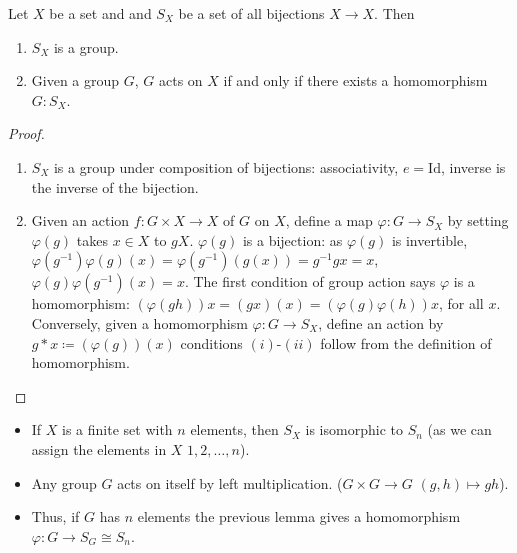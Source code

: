 \documentclass[10pt, a4paper]{article}
\begin{document}
\begin{lemma}
    Let $X$ be a set and and $S_X$ be a set of all bijections $X \to X$.
    Then
    \begin{enumerate}[label = (\alph*)]
        \item $S_X$ is a group.

        \item Given a group $G$,
        $G$ acts on $X$ if and only if there exists a homomorphism $G : S_X$.
    \end{enumerate}

    \begin{proof}
        \begin{enumerate}[label = (\alph*)]
            \item $S_{X}$ is a group under composition of bijections:
            associativity,
            $e = \mathrm{Id}$,
            inverse is the inverse of the bijection.

            \item Given an action $f : G \times X \to X$ of $G$ on $X$,
            define a map $\varphi : G \to S_X$ by setting $\varphi(g)$ takes $x \in X$ to $gX$.
            $\varphi(g)$ is a bijection:
            as $\varphi(g)$ is invertible,
            $\varphi(g ^ {-1})\varphi(g)(x) = \varphi(g ^ {-1})(g(x)) = g ^ {-1}gx = x$,
            $\varphi(g)\varphi(g ^ {-1})(x) = x$.
            The first condition of group action says $\varphi$ is a homomorphism:
            $(\varphi(gh))x = (gx)(x) = (\varphi(g)\varphi(h))x$,
            for all $x$.
            Conversely,
            given a homomorphism $\varphi : G \to S_X$,
            define an action by $g * x \coloneqq (\varphi(g))(x)$ conditions $(i)$-$(ii)$ follow from the definition of homomorphism.
        \end{enumerate}
    \end{proof}
\end{lemma}

\begin{remark}
    \begin{itemize}
        \item If $X$ is a finite set with $n$ elements,
        then $S_X$ is isomorphic to $S_n$
        (as we can assign the elements in $X$ $1, 2, \dotsc, n$).

        \item Any group $G$ acts on itself by left multiplication.
        ($G \times G \to G$ $(g, h) \mapsto gh$).

        \item Thus,
        if $G$ has $n$ elements the previous lemma gives a homomorphism $\varphi : G \to S_{G} \cong S_n$.
    \end{itemize}
\end{remark}
\end{document}
